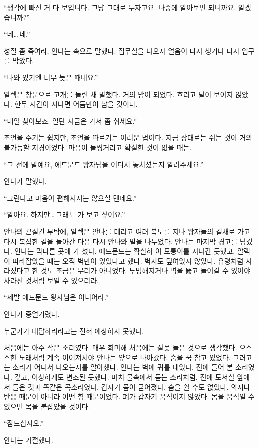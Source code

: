 ``생각에 빠진 거 다 보입니다. 그냥 그대로 두자고요. 나중에 알아보면 되니까요. 알겠습니까?''

``네\ldots\,네.''

성질 좀 죽여라, 안나는 속으로 말했다. 집무실을 나오자 얼음이 다시 생겨나 다시 입구를 막았다.

``나와 있기엔 너무 늦은 때네요.''

알렉은 창문으로 고개를 돌린 채 말했다. 거의 밤이 되었다. 흐리고 달이 보이지 않았다. 한두 시간이 지나면 어둠만이 남을 것이다.

``내일 찾아보죠. 일단 지금은 가서 좀 쉬세요.''

조언을 주기는 쉽지만, 조언을 따르기는 어려운 법이다. 지금 상태로는 쉬는 것이 거의 불가능할 지경이었다. 마음이 들썽거리고 확실한 것이 없을 때는.

``그 전에 말예요, 에드문드 왕자님을 어디서 놓치셨는지 알려주세요.''

안나가 말했다.

``그런다고 마음이 편해지지는 않으실 텐데요.''

``알아요. 하지만\ldots\,그래도 가 보고 싶어요.''

안나의 끈질긴 부탁에, 알렉은 안나를 데리고 여러 복도를 지나 왕자들의 곁채로 가고 다시 복잡한 길을 돌아간 다음 다시 안나와 말을 나누었다. 안나는 마지막 경고를 남겼다. 안나는 막다른 곳에 가 섰다. 에드문드는 확실히 이 모퉁이를 지나간 듯했고, 알렉이 따라잡았을 때는 오직 벽만이 있었다고 했다. 벽지도 덮여있지 않았다. 유령처럼 사라졌다고 한 것도 조금은 무리가 아니었다. 투명해지거나 벽을 뚫고 들어갈 수 있어야 사라진 것처럼 보일 수 있으리라.

``제발 에드문드 왕자님은 아니어라.''

안나가 중얼거렸다.

누군가가 대답하리라고는 전혀 예상하지 못했다.

처음에는 아주 작은 소리였다. 매우 희미해 처음에는 잘못 들은 것으로 생각했다. 으스스한 노래처럼 계속 이어져서야 안나는 앞으로 나아갔다. 숨을 꾹 참고 있었다. 그러고는 소리가 어디서 나오는지를 알아챘다. 안나는 벽에 귀를 대었다. 전에 들어 본 소리였다. 깊고, 이상하게도 변조된 듯했다. 마치 물속에서 듣는 소리처럼. 전에 도서실 앞에서 들은 것과 똑같은 목소리였다. 갑자기 몸이 굳어졌다. 숨을 쉴 수도 없었다. 의지나 반응 때문이 아니라 어떤 힘 때문이었다. 폐가 갑자기 움직이지 않았다. 몸을 움직일 수 있으면 목을 붙잡았을 것이다.

``잠드십시오.''

안나는 기절했다.



